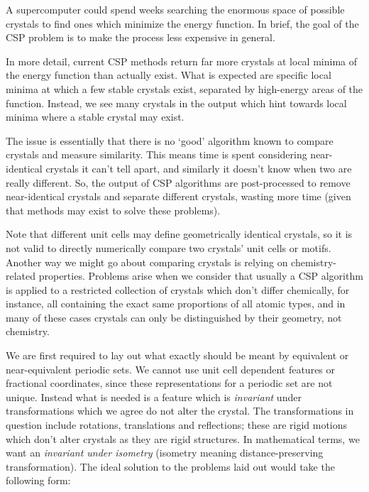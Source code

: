 \documentclass[11pt]{article}
\theoremstyle{definition}
\begin{document}
A supercomputer could spend weeks searching the enormous space of possible crystals to find ones which minimize the energy function. In brief, the goal of the CSP problem is to make the process less expensive in general.

\null

In more detail, current CSP methods return far more crystals at local minima of the energy function than actually exist. What is expected are specific local minima at which a few stable crystals exist, separated by high-energy areas of the function. Instead, we see many crystals in the output which hint towards local minima where a stable crystal may exist.

 The issue is essentially that there is no `good' algorithm known to compare crystals and measure similarity. This means time is spent considering near-identical crystals it can't tell apart, and similarly it doesn't know when two are really different. So, the output of CSP algorithms are post-processed to remove near-identical crystals and separate different crystals, wasting more time (given that methods may exist to solve these problems). 

Note that different unit cells may define geometrically identical crystals, so it is not valid to directly numerically compare two crystals' unit cells or motifs. Another way we might go about comparing crystals is relying on chemistry-related properties. Problems arise when we consider that usually a CSP algorithm is applied to a restricted collection of crystals which don't differ chemically, for instance, all containing the exact same proportions of all atomic types, and in many of these cases crystals can only be distinguished by their geometry, not chemistry.  

\null

We are first required to lay out what exactly should be meant by equivalent or near-equivalent periodic sets. We cannot use unit cell dependent features or fractional coordinates, since these representations for a periodic set are not unique. Instead what is needed is a feature which is \emph{invariant} under transformations which we agree do not alter the crystal. The transformations in question include rotations, translations and reflections; these are rigid motions which don't alter crystals as they are rigid structures. In mathematical terms, we want an \emph{invariant under isometry} (isometry meaning distance-preserving transformation). The ideal solution to the problems laid out would take the following form:
\end{document}
